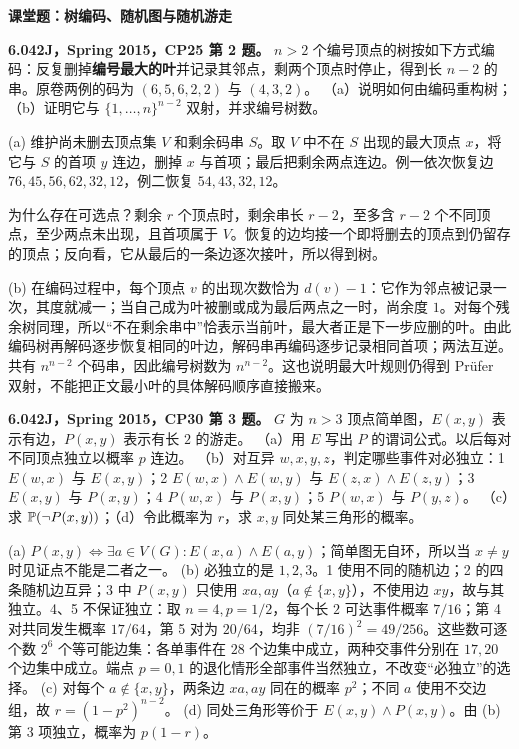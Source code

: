 \par\addvspace{7pt}\noindent\textbf{课堂题：树编码、随机图与随机游走}\par
\begin{exercise}\label{mit:6042-cp25-q2}
\textbf{6.042J，Spring 2015，CP25 第 2 题。}
$n>2$ 个编号顶点的树按如下方式编码：反复删掉\textbf{编号最大的叶}并记录其邻点，剩两个顶点时停止，得到长 $n-2$ 的串。原卷两例的码为 $(6,5,6,2,2)$ 与 $(4,3,2)$。
（a）说明如何由编码重构树；（b）证明它与 $\{1,\ldots,n\}^{n-2}$ 双射，并求编号树数。
\end{exercise}
\begin{solution}
(a) 维护尚未删去顶点集 $V$ 和剩余码串 $S$。取 $V$ 中不在 $S$ 出现的最大顶点 $x$，将它与 $S$ 的首项 $y$ 连边，删掉 $x$ 与首项；最后把剩余两点连边。例一依次恢复边 $76,45,56,62,32,12$，例二恢复 $54,43,32,12$。

为什么存在可选点？剩余 $r$ 个顶点时，剩余串长 $r-2$，至多含 $r-2$ 个不同顶点，至少两点未出现，且首项属于 $V$。恢复的边均接一个即将删去的顶点到仍留存的顶点；反向看，它从最后的一条边逐次接叶，所以得到树。

(b) 在编码过程中，每个顶点 $v$ 的出现次数恰为 $d(v)-1$：它作为邻点被记录一次，其度就减一；当自己成为叶被删或成为最后两点之一时，尚余度 $1$。对每个残余树同理，所以“不在剩余串中”恰表示当前叶，最大者正是下一步应删的叶。由此编码树再解码逐步恢复相同的叶边，解码串再编码逐步记录相同首项；两法互逆。共有 $n^{n-2}$ 个码串，因此编号树数为 $n^{n-2}$。这也说明最大叶规则仍得到 Prüfer 双射，不能把正文最小叶的具体解码顺序直接搬来。
\end{solution}

\begin{exercise}\label{mit:6042-cp30-q3}
\textbf{6.042J，Spring 2015，CP30 第 3 题。}
$G$ 为 $n>3$ 顶点简单图，$E(x,y)$ 表示有边，$P(x,y)$ 表示有长 $2$ 的游走。
（a）用 $E$ 写出 $P$ 的谓词公式。以后每对不同顶点独立以概率 $p$ 连边。
（b）对互异 $w,x,y,z$，判定哪些事件对必独立：1 $E(w,x)$ 与 $E(x,y)$；2 $E(w,x)\land E(w,y)$ 与 $E(z,x)\land E(z,y)$；3 $E(x,y)$ 与 $P(x,y)$；4 $P(w,x)$ 与 $P(x,y)$；5 $P(w,x)$ 与 $P(y,z)$。
（c）求 $\mathbb P(\neg P(x,y))$；（d）令此概率为 $r$，求 $x,y$ 同处某三角形的概率。
\end{exercise}
\begin{solution}
(a) $P(x,y)\iff\exists a\in V(G):E(x,a)\land E(a,y)$；简单图无自环，所以当 $x\ne y$ 时见证点不能是二者之一。
(b) 必独立的是 $1,2,3$。1 使用不同的随机边；2 的四条随机边互异；3 中 $P(x,y)$ 只使用 $xa,ay$（$a\notin\{x,y\}$），不使用边 $xy$，故与其独立。4、5 不保证独立：取 $n=4,p=1/2$，每个长 $2$ 可达事件概率 $7/16$；第 4 对共同发生概率 $17/64$，第 5 对为 $20/64$，均非 $(7/16)^2=49/256$。这些数可逐个数 $2^6$ 个等可能边集：各单事件在 $28$ 个边集中成立，两种交事件分别在 $17,20$ 个边集中成立。端点 $p=0,1$ 的退化情形全部事件当然独立，不改变“必独立”的选择。
(c) 对每个 $a\notin\{x,y\}$，两条边 $xa,ay$ 同在的概率 $p^2$；不同 $a$ 使用不交边组，故
$r=(1-p^2)^{n-2}$。
(d) 同处三角形等价于 $E(x,y)\land P(x,y)$。由 (b) 第 3 项独立，概率为 $p(1-r)$。
\end{solution}

